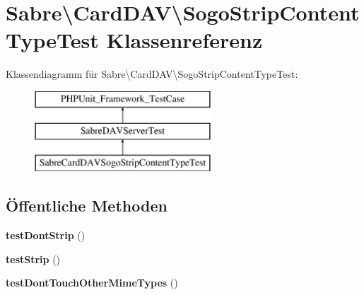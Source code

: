\hypertarget{class_sabre_1_1_card_d_a_v_1_1_sogo_strip_content_type_test}{}\section{Sabre\textbackslash{}Card\+D\+AV\textbackslash{}Sogo\+Strip\+Content\+Type\+Test Klassenreferenz}
\label{class_sabre_1_1_card_d_a_v_1_1_sogo_strip_content_type_test}
Klassendiagramm für Sabre\textbackslash{}Card\+D\+AV\textbackslash{}Sogo\+Strip\+Content\+Type\+Test\+:\begin{figure}[H]
\begin{center}
\leavevmode
\includegraphics[height=3.000000cm]{class_sabre_1_1_card_d_a_v_1_1_sogo_strip_content_type_test}
\end{center}
\end{figure}
\subsection*{Öffentliche Methoden}
\begin{DoxyCompactItemize}
\item 
\mbox{\label{class_sabre_1_1_card_d_a_v_1_1_sogo_strip_content_type_test_a9efcef91404f6ee7829a5a18a480bb21}} 
{\bfseries test\+Dont\+Strip} ()
\item 
\mbox{\label{class_sabre_1_1_card_d_a_v_1_1_sogo_strip_content_type_test_a3f6da1b28d3768e5b4e981237e67e23a}} 
{\bfseries test\+Strip} ()
\item 
\mbox{\label{class_sabre_1_1_card_d_a_v_1_1_sogo_strip_content_type_test_a225a4abd7476112d062c08162291a3cd}} 
{\bfseries test\+Dont\+Touch\+Other\+Mime\+Types} ()
\end{DoxyCompactItemize}
